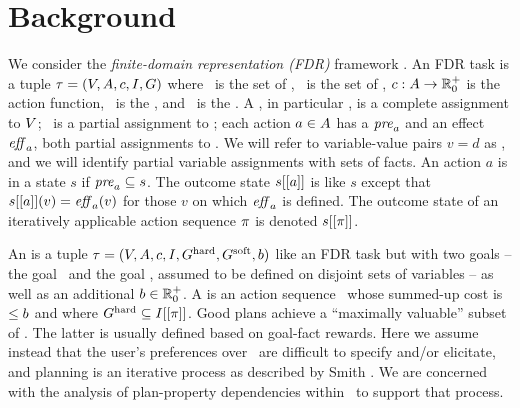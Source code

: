 \section{Background}
\label{background}



We consider the \emph{finite-domain representation (FDR)} framework
\cite{backstrom:nebel:ci-95,helmert:ai-09}.
%
An FDR task  is a tuple $\tau =
(V,A,{c},I,G)$ where \vars\ is the set of
, \acts\ is the set of , ${c}:
A \to {\mathbb{R}}^+_0$ is the action  function, \init\ is
the , and \goal\ is the . A
, in particular \init, is a complete assignment to
$V$; \goal\ is a partial assignment to \vars; each action $a \in
A$ has a  $\mathit{pre}_a$ and an effect $\mathit{eff}_a$,
both partial assignments to \vars. We will refer to variable-value
pairs $v=d$ as , and we will identify partial variable
assignments with sets of facts.
%
An action $a$ is  in a state $s$ if $\mathit{pre}_a
\subseteq s$. The outcome state $s[[a]]$ is like $s$ except that
$s[[a]](v) = \mathit{eff}_a(v)$ for those $v$ on which $\mathit{eff}_a$ is
defined. The outcome state of an iteratively applicable action
sequence $\pi$ is denoted $s[[\pi]]$.

An  is a tuple $\tau =
(V,\allowbreak A,\allowbreak{\ensuremath{c}},\allowbreak I,\allowbreak G^{\text{\textup{hard}}},\allowbreak G^{\text{\textup{soft}}},\allowbreak{\ensuremath{b}})$
like an FDR task but with two goals -- the  goal
\goalhard\ and the  goal \goalsoft, assumed to be
defined on disjoint sets of variables -- as well as an additional
 ${b} \in {\mathbb{R}}^+_0$. A  is
an action sequence \plan\ whose summed-up cost is $\leq {\ensuremath{b}}$
and where $G^{\text{\textup{hard}}} \subseteq I[[\pi]]$. Good plans achieve
a ``maximally valuable'' subset of \goalsoft. The latter is usually
defined based on goal-fact rewards. Here we assume instead that the
user's preferences over \goalsoft\ are difficult to specify and/or
elicitate, and planning is an iterative process as described by Smith
. We are concerned with the analysis of
plan-property dependencies within \goalsoft\ to support that process.

